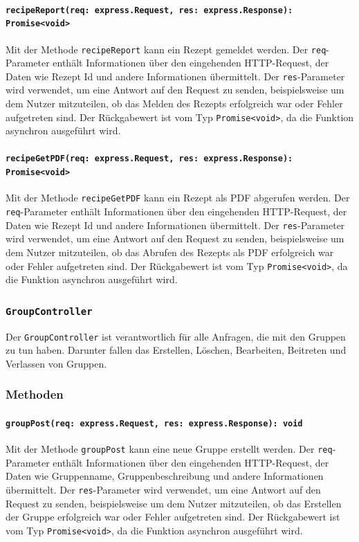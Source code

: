 \documentclass{entwurfsheft}
\begin{document}
\paragraph{\texttt{recipeReport(req: express.Request, res: express.Response): Promise<void>}}
Mit der Methode \texttt{recipeReport} kann ein Rezept gemeldet werden. Der \texttt{req}-Parameter enthält Informationen über den eingehenden HTTP-Request, der Daten wie Rezept Id und andere Informationen übermittelt. Der \texttt{res}-Parameter wird verwendet, um eine Antwort auf den Request zu senden, beispielsweise um dem Nutzer mitzuteilen, ob das Melden des Rezepts erfolgreich war oder Fehler aufgetreten sind.
Der Rückgabewert ist vom Typ \texttt{Promise<void>}, da die Funktion asynchron ausgeführt wird.
\paragraph{\texttt{recipeGetPDF(req: express.Request, res: express.Response): Promise<void>}}
Mit der Methode \texttt{recipeGetPDF} kann ein Rezept als PDF abgerufen werden. Der \texttt{req}-Parameter enthält Informationen über den eingehenden HTTP-Request, der Daten wie Rezept Id und andere Informationen übermittelt. Der \texttt{res}-Parameter wird verwendet, um eine Antwort auf den Request zu senden, beispielsweise um dem Nutzer mitzuteilen, ob das Abrufen des Rezepts als PDF erfolgreich war oder Fehler aufgetreten sind.
Der Rückgabewert ist vom Typ \texttt{Promise<void>}, da die Funktion asynchron ausgeführt wird.


\subsubsection{\texttt{GroupController}}\label{sec:GroupController}
Der \texttt{GroupController} ist verantwortlich für alle Anfragen, die mit den Gruppen zu tun haben. Darunter fallen das Erstellen, Löschen, Bearbeiten, Beitreten und Verlassen von Gruppen.
\subsubsection*{Methoden}
\paragraph{\texttt{groupPost(req: express.Request, res: express.Response): void}}
Mit der Methode \texttt{groupPost} kann eine neue Gruppe erstellt werden. Der \texttt{req}-Parameter enthält Informationen über den eingehenden HTTP-Request, der Daten wie Gruppenname, Gruppenbeschreibung und andere Informationen übermittelt. Der \texttt{res}-Parameter wird verwendet, um eine Antwort auf den Request zu senden, beispielsweise um dem Nutzer mitzuteilen, ob das Erstellen der Gruppe erfolgreich war oder Fehler aufgetreten sind.
Der Rückgabewert ist vom Typ \texttt{Promise<void>}, da die Funktion asynchron ausgeführt wird.
\end{document}
